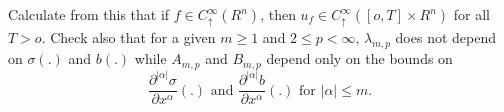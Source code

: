 Calculate from this that if $f \in C^\infty_\uparrow (R^n)$, then
$u_f \in C^\infty_\uparrow ([o,T] \times R^n)$ for all $T > o$. Check
also that for a given $m \geq 1$ and $2 \leq p < \infty$,
$\lambda_{m,p}$ does not depend on $\sigma (.)$ and $b(.)$ while
$A_{m,p}$ and $B_{m,p}$ depend only on the bounds on   
$$
\frac{\partial^{|\alpha|}\sigma}{\partial x^\alpha}(.)\text{ and }
\frac{\partial^{| \alpha|}b}{\partial x^\alpha}(.) \text{ for } 
|\alpha | \leq m. 
$$


